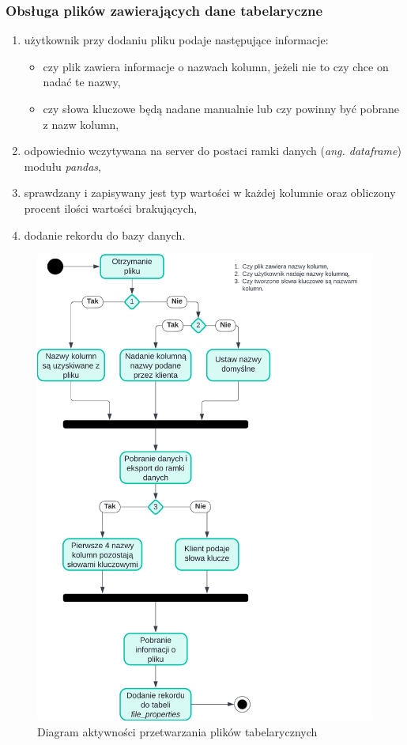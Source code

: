 \documentclass[12pt,a4paper,twoside]{article}
\begin{document}
\subsubsection{Obsługa plików zawierających dane tabelaryczne}
\begin{enumerate}
	\item użytkownik przy dodaniu pliku podaje następujące informacje:
	\begin{itemize}
		\item czy plik zawiera informacje o nazwach kolumn, jeżeli nie to czy chce on nadać te nazwy,
		\item czy słowa kluczowe będą nadane manualnie lub czy powinny być pobrane z nazw kolumn,
	\end{itemize}
	\item odpowiednio wczytywana na server do postaci ramki danych (\textit{ang. dataframe}) modułu \textit{pandas},
	\item sprawdzany i zapisywany jest typ wartości w każdej kolumnie oraz obliczony procent ilości wartości brakujących,
	\item dodanie rekordu do bazy danych.
\end{enumerate}
\begin{figure}[h!]
\centering
  \includegraphics[width=\textwidth]{img/csvac.png}
  \caption{Diagram aktywności przetwarzania plików tabelarycznych}
\end{figure}
\newpage
\end{document}
